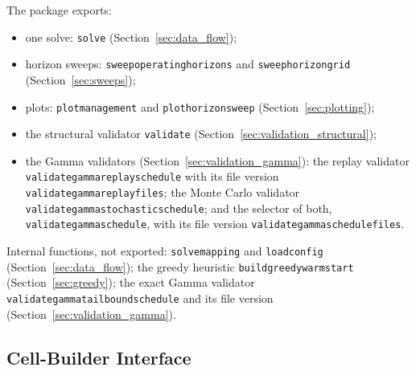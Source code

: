 \documentclass[11pt,a4paper]{article}
\theoremstyle{plain}
\theoremstyle{definition}
\renewcommand{\_}{\textunderscore\allowbreak{}}
\begin{document}
The package exports:
\begin{itemize}[nosep]
  \item one solve: \texttt{solve} (Section~\ref{sec:data_flow});
  \item horizon sweeps: \texttt{sweep\_operating\_horizons} and \texttt{sweep\_horizon\_grid} (Section~\ref{sec:sweeps});
  \item plots: \texttt{plot\_management} and \texttt{plot\_horizon\_sweep} (Section~\ref{sec:plotting});
  \item the structural validator \texttt{validate} (Section~\ref{sec:validation_structural});
  \item the Gamma validators (Section~\ref{sec:validation_gamma}): the replay validator \texttt{validate\_gamma\_replay\_schedule} with its file version \texttt{validate\_gamma\_replay\_files}; the Monte Carlo validator \texttt{validate\_gamma\_stochastic\_schedule}; and the selector of both, \texttt{validate\_gamma\_schedule}, with its file version \texttt{validate\_gamma\_schedule\_files}.
\end{itemize}
Internal functions, not exported: \texttt{solve\_mapping} and \texttt{load\_config} (Section~\ref{sec:data_flow}); the greedy heuristic \texttt{build\_greedy\_warm\_start} (Section~\ref{sec:greedy}); the exact Gamma validator \texttt{validate\_gamma\_tail\_bound\_schedule} and its file version (Section~\ref{sec:validation_gamma}).

\subsection{Cell-Builder Interface}
\label{sec:builders}
\end{document}
